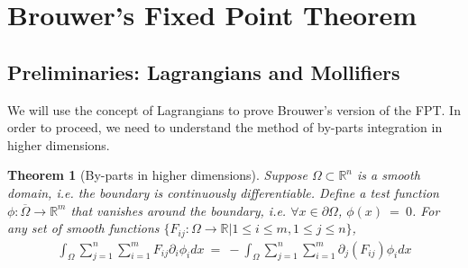 \documentclass[10pt]{article}
\numberwithin{equation}{section}
\newtheorem{theorem}{Theorem}
\numberwithin{theorem}{section}
\numberwithin{proposition}{section}
\numberwithin{lemma}{section}
\numberwithin{corollary}{section}
\numberwithin{remark}{section}
\numberwithin{definition}{section}
\numberwithin{example}{section}
\numberwithin{conjecture}{section}
\numberwithin{question}{section}
\begin{document}
\section{Brouwer's Fixed Point Theorem}

\subsection{Preliminaries: Lagrangians and Mollifiers}

We will use the concept of Lagrangians to prove Brouwer's version of 
the FPT. In order to proceed, we need to understand the method of 
by-parts integration in higher dimensions. 

\begin{theorem} [By-parts in higher dimensions]
    Suppose $\Omega \subset \mathbb R^n$ is a smooth domain, i.e. the 
    boundary is continuously differentiable. Define a test function 
    $\phi: \overline \Omega \rightarrow \mathbb R^m$ that vanishes 
    around the boundary, i.e. $\forall x \in \partial \Omega$, 
        $\phi(x) \ = \ 0$. For any set of smooth functions $\{F_{ij}:\Omega\rightarrow \mathbb R 
        | 1 \leq i \leq m , 1 \leq j \leq n\}$, 
        \begin{align}
            \int_\Omega \sum_{j = 1}^n \sum_{i = 1}^m F_{ij} \partial_i \phi_i dx \ = \ 
            - \int_{\Omega} \sum_{j = 1}^n 
                \sum_{i = 1}^m \partial_j\left(F_{ij}
            \right)\phi_i dx
        \end{align}
\end{theorem}
\end{document}
